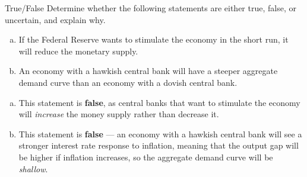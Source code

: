 \documentclass[10pt]{extarticle}
\begin{document}
  \begin{problem}{True/False}
    Determine whether the following statements are either true, false, or uncertain, and explain why.
    \begin{enumerate}[(a)]
      \item If the Federal Reserve wants to stimulate the economy in the short run, it will reduce the monetary supply.
      \item An economy with a hawkish central bank will have a steeper aggregate demand curve than an economy with a dovish central bank.
    \end{enumerate}
    \tcblower
    \begin{enumerate}[(a)]
      \item This statement is \textbf{false}, as central banks that want to stimulate the economy will \textit{increase} the money supply rather than decrease it.
      \item This statement is \textbf{false} --- an economy with a hawkish central bank will see a stronger interest rate response to inflation, meaning that the output gap will be higher if inflation increases, so the aggregate demand curve will be \textit{shallow}.
    \end{enumerate}
  \end{problem}
\end{document}
